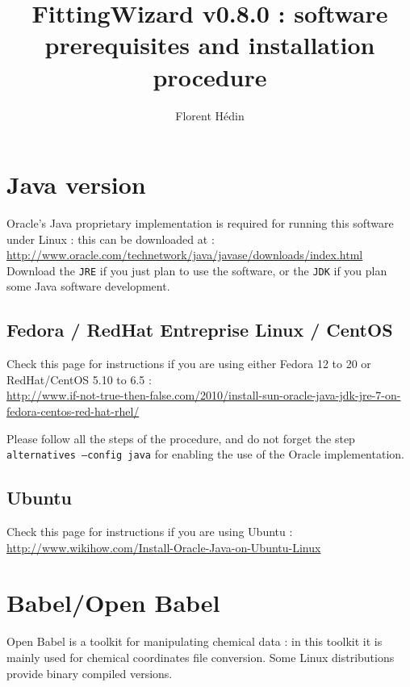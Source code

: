 \documentclass[11pt,a4paper]{article}
\author{Florent Hédin}
\date{}
\title{FittingWizard v0.8.0 : software prerequisites and installation 
procedure}
\begin{document}
\maketitle

\section{Java version}
Oracle's Java proprietary implementation is required for running this software 
under Linux : this can be downloaded at :\\ 
\href{http://www.oracle.com/technetwork/java/javase/downloads/index.html}
{http://www.oracle.com/technetwork/java/javase/downloads/index.html}\\

Download the \texttt{JRE} if you just plan to use the software, or the 
\texttt{JDK} if you plan some Java software development.

\subsection{Fedora / RedHat Entreprise Linux / CentOS}
Check this page for instructions if you are using either Fedora 12 to 20 or 
RedHat/CentOS 5.10 to 6.5 : \\
\href{http://www.if-not-true-then-false.com/2010/install-sun-oracle-java-jdk-jre-7-on-fedora-centos-red-hat-rhel/}
{http://www.if-not-true-then-false.com/2010/install-sun-oracle-java-jdk-jre-7-on-fedora-centos-red-hat-rhel/}

Please follow all the steps of the procedure, and do not forget the step 
\texttt{alternatives --config java} for enabling the use of the Oracle 
implementation.\\

\subsection{Ubuntu}
Check this page for instructions if you are using Ubuntu :\\
\href{http://www.wikihow.com/Install-Oracle-Java-on-Ubuntu-Linux}
{http://www.wikihow.com/Install-Oracle-Java-on-Ubuntu-Linux}

\section{Babel/Open Babel}
Open Babel is a toolkit for manipulating chemical data : in this toolkit it is 
mainly used for chemical coordinates file conversion. Some Linux distributions 
provide binary compiled versions.\\
\end{document}
